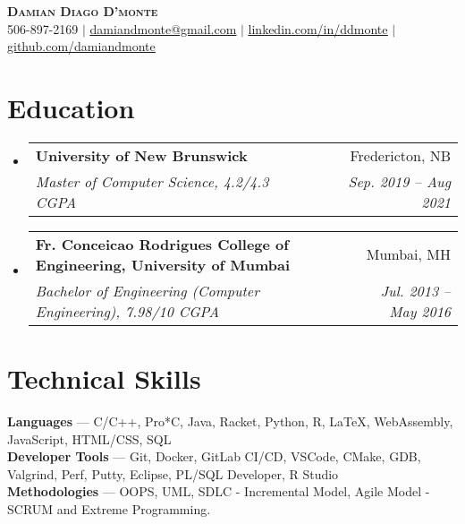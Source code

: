 \documentclass[letterpaper,10pt]{article}
\makeatletter
\newcommand{\resumeSubheading}[4]{
  \vspace{-2pt}\item
    \begin{tabular*}{0.97\textwidth}[t]{l@{\extracolsep{\fill}}r}
      \textbf{#1} & #2 \\
      \textit{\small#3} & \textit{\small #4} \\
    \end{tabular*}\vspace{-7pt}
}
\newcommand{\resumeSubHeadingListStart}{\begin{itemize}[leftmargin=0.15in, label={}]}
\newcommand{\resumeSubHeadingListEnd}{\end{itemize}}
\makeatother
\begin{document}

\begin{center}
    \textbf{\Huge \scshape Damian Diago D'monte} \\ \vspace{4pt}
    \small 506-897-2169 $|$ \href{mailto:x@x.com}{\underline{damiandmonte@gmail.com}} $|$ 
    \href{https://linkedin.com/in/ddmonte}{\underline{linkedin.com/in/ddmonte}} $|$
    \href{https://github.com/damiandmonte}{\underline{github.com/damiandmonte}}
\end{center}


\section{Education}
  \resumeSubHeadingListStart
    \resumeSubheading
      {University of New Brunswick}{Fredericton, NB}
      {Master of Computer Science, 4.2/4.3 CGPA}{Sep. 2019 -- Aug 2021}
    \resumeSubheading
      {Fr. Conceicao Rodrigues College of Engineering, University of Mumbai}{Mumbai, MH}
      {Bachelor of Engineering (Computer Engineering), 7.98/10 CGPA }{Jul. 2013 -- May 2016}
  \resumeSubHeadingListEnd


%
\section{Technical Skills}
 \begin{itemize}[leftmargin=0.15in, label={}]
    \small{\item{
     \textbf{Languages}{ --- C/C++, Pro*C, Java, Racket, Python, R, \LaTeX{}, WebAssembly, JavaScript, HTML/CSS, SQL} \\
     \textbf{Developer Tools}{ --- Git, Docker, GitLab CI/CD, VSCode, CMake, GDB, Valgrind, Perf, Putty, Eclipse, PL/SQL Developer, R Studio} \\
     \textbf{Methodologies}{ --- OOPS, UML, SDLC - Incremental Model, Agile Model - SCRUM and Extreme Programming.}
    }}
 \end{itemize}
\end{document}
